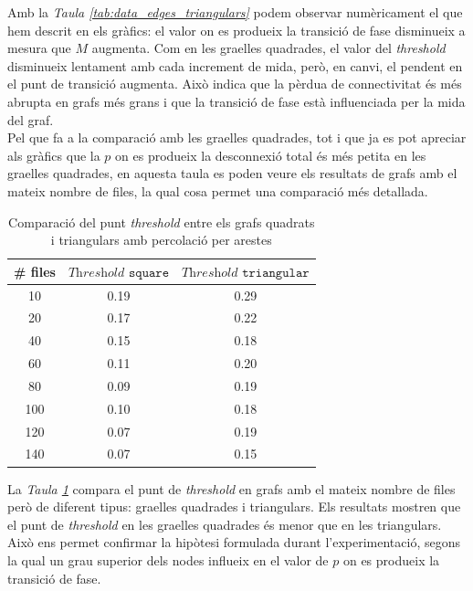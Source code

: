 \documentclass[a4paper]{article}
\begin{document}
	Amb la \textit{Taula \ref{tab:data_edges_triangulars}} podem observar numèricament el que hem descrit en els gràfics: el valor on es produeix la transició de fase disminueix a mesura que $M$ augmenta. Com en les graelles quadrades, el valor del \textit{threshold} disminueix lentament amb cada increment de mida, però, en canvi, el pendent en el punt de transició augmenta. Això indica que la pèrdua de connectivitat és més abrupta en grafs més grans i que la transició de fase està influenciada per la mida del graf. \\
	
	Pel que fa a la comparació amb les graelles quadrades, tot i que ja es pot apreciar als gràfics que la $p$ on es produeix la desconnexió total és més petita en les graelles quadrades, en aquesta taula es poden veure els resultats de grafs amb el mateix nombre de files, la qual cosa permet una comparació més detallada.
	
	
	\begin{table}[H]
		\centering
		\begin{tabular}{|c|c|c|}
			\hline
			\rowcolor{gray!30}
			\# files & $\textit{Threshold}\texttt{ square}$ &$\textit{Threshold}\texttt{ triangular}$ \\ \hline
			10 & 0.19 & 0.29 \\ \hline
			20 & 0.17 & 0.22 \\ \hline
			40 & 0.15 & 0.18 \\ \hline
			60 & 0.11 & 0.20 \\ \hline
			80 & 0.09 & 0.19 \\ \hline
			100 & 0.10 & 0.18\\ \hline
			120 & 0.07 & 0.19 \\ \hline
			140 & 0.07 & 0.15 \\ \hline
		\end{tabular}
		\caption{Comparació del punt \textit{threshold} entre els grafs quadrats i triangulars amb percolació per arestes}
		\label{tab:comparacio_threshold_square_triangular_edges}
	\end{table}
	
	La \textit{Taula \ref{tab:comparacio_threshold_square_triangular_edges}} compara el punt de \textit{threshold} en grafs amb el mateix nombre de files però de diferent tipus: graelles quadrades i triangulars. Els resultats mostren que el punt de \textit{threshold} en les graelles quadrades és menor que en les triangulars. Això ens permet confirmar la hipòtesi formulada durant l'experimentació, segons la qual un grau superior dels nodes influeix en el valor de $p$ on es produeix la transició de fase.
	
\end{document}
